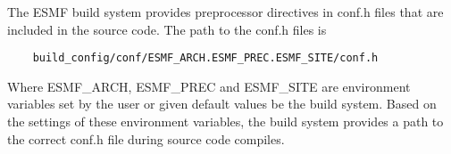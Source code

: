 The ESMF build system provides preprocessor directives in conf.h files
that are included in the source code.  The path to the conf.h files is

\begin{verbatim}
    build_config/conf/ESMF_ARCH.ESMF_PREC.ESMF_SITE/conf.h
\end{verbatim}

Where ESMF\_ARCH, ESMF\_PREC and ESMF\_SITE are environment variables 
set by the user or given default values be the build system.  Based on 
the settings of these environment variables, the build system provides
a path to the correct conf.h file during source code compiles.

